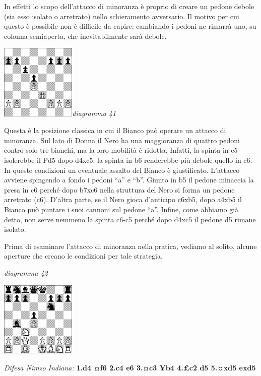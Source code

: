 \documentclass[
]{article}
\begin{document}
In effetti lo scopo dell'attacco di minoranza è proprio di creare un
pedone debole (sia esso isolato o arretrato) nello schieramento
avversario. Il motivo per cui questo è possibile non è difficile da
capire: cambiando i pedoni ne rimarrà uno, su colonna semiaperta, che
inevitabilmente sarà debole.

\includegraphics[width=1.40972in,height=1.40972in]{vertopal_109f12be458a423d8f3cc838880eaea2/media/image41.png}\emph{diagramma
41}

Questa è la posizione classica in cui il Bianco può operare un attacco
di minoranza. Sul lato di Donna il Nero ha una maggioranza di quattro
pedoni contro solo tre bianchi, ma la loro mobilità è ridotta. Infatti,
la spinta in c5 isolerebbe il Pd5 dopo d4xc5; la spinta in b6 renderebbe
più debole quello in c6. In queste condizioni un eventuale assalto del
Bianco è giustificato. L'attacco avviene spingendo a fondo i pedoni
``a'' e ``b''. Giunto in b5 il pedone minaccia la presa in c6 perché
dopo b7xc6 nella struttura del Nero si forma un pedone arretrato (c6).
D'altra parte, se il Nero gioca d'anticipo c6xb5, dopo a4xb5 il Bianco
può puntare i suoi cannoni sul pedone ``a''. Infine, come abbiamo già
detto, non serve nemmeno la spinta c6-c5 perché dopo d4xc5 il pedone d5
rimane isolato.

Prima di esaminare l'attacco di minoranza nella pratica, vediamo al
solito, alcune aperture che creano le condizioni per tale strategia.

\emph{diagramma 42}

\includegraphics[width=1.40972in,height=1.40972in]{vertopal_109f12be458a423d8f3cc838880eaea2/media/image42.png}

\emph{Difesa Nimzo Indiana:} \textbf{1.d4 ¤f6 2.c4 e6 3.¤c3 ¥b4 4.£c2 d5
5.¤xd5 exd5}
\end{document}
